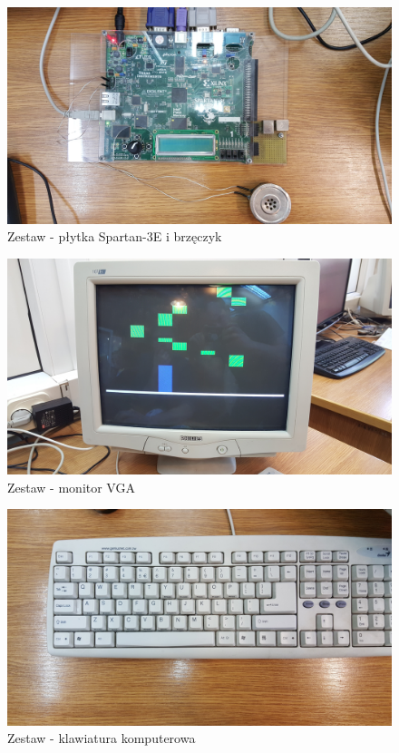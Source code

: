 \documentclass[a4paper]{report}
\begin{document}
	
	\begin{figure}[h!]
				\centering
				\includegraphics[width=1.0\textwidth]{zestaw_plytka_i_glosniczek2.jpg}
				\caption{Zestaw - płytka Spartan-3E i brzęczyk}
	\end{figure}	
	
	\begin{figure}[h!]
				\centering
				\includegraphics[width=1.0\textwidth]{zestaw_monitor3.jpg}
				\caption{Zestaw - monitor VGA}
	\end{figure}	
	
	\begin{figure}[h!]
				\centering
				\includegraphics[width=1.0\textwidth]{zestaw_klawiatura.jpg}
				\caption{Zestaw - klawiatura komputerowa}
	\end{figure}	
	
\end{document}
